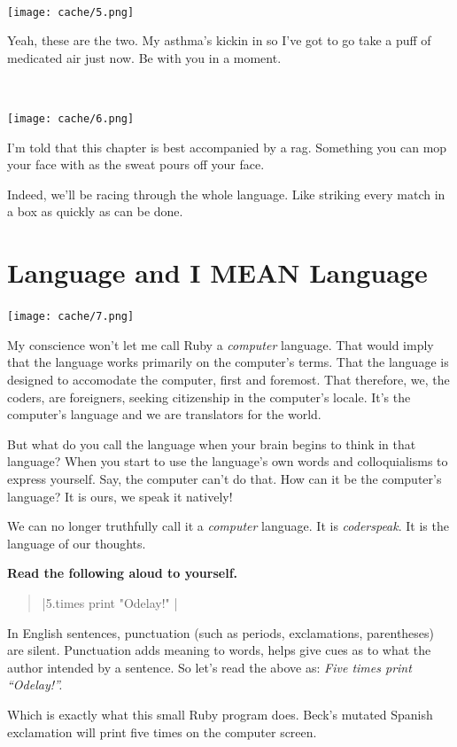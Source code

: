 \documentclass[12pt,twoside]{report}
\begin{document}
\ %

	\texttt{[image: cache/5.png]}

Yeah, these are the two.  My asthma's kickin in so I've got to go take
a puff of medicated air just now.  Be with you in a moment.

\ %

	\texttt{[image: cache/6.png]}


I'm told that this chapter is best accompanied by a rag.  Something
you can mop your face with as the sweat pours off your face.

Indeed, we'll be racing through the whole language.  Like striking
every match in a box as quickly as can be done.

\pagebreak

\section{Language and I MEAN Language}

	\texttt{[image: cache/7.png]}

My conscience won't let me call Ruby a {\em computer} language.  That
would imply that the language works primarily on the computer's terms.
That the language is designed to accomodate the computer, first and
foremost.  That therefore, we, the coders, are foreigners, seeking
citizenship in the computer's locale.  It's the computer's language
and we are translators for the world.

But what do you call the language when your brain begins to think in
that language?  When you start to use the language's own words and
colloquialisms to express yourself.  Say, the computer can't do that.
How can it be the computer's language?  It is ours, we speak it
natively!

We can no longer truthfully call it a {\em computer} language.  It is
{\em coderspeak}.  It is the language of our thoughts.

{\bf Read the following aloud to yourself.}

\begin{quote}
\rubyinline|5.times { print "Odelay!" }|\end{quote}

In English sentences, punctuation (such as periods, exclamations,
parentheses) are silent.  Punctuation adds meaning to words, helps
give cues as to what the author intended by a sentence.  So let's read
the above as: {\em Five times print ``Odelay!''.}

Which is exactly what this small Ruby program does.  Beck's mutated
Spanish exclamation will print five times on the computer screen.
\end{document}
